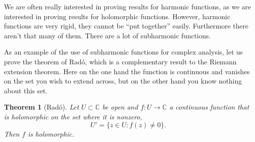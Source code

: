 \documentclass[12pt,openany]{book}
\newcommand{\C}{{\mathbb{C}}}
\theoremstyle{plain}
\newtheorem{thm}{Theorem}[section]
\theoremstyle{remark}
\theoremstyle{definition}
\theoremstyle{exercise}
\theoremstyle{example}
\begin{document}
We are often really interested in proving results for harmonic functions,
as we are interested in proving results for holomorphic functions.
However, harmonic functions are very rigid, they cannot be ``put together''
easily.  Furthermore there aren't that many of them.  There are a lot of
subharmonic functions.

As an example of the use of subharmonic functions for
complex analysis,
let us prove the theorem of 
Rad\'o, which is a complementary result to the Riemann extension theorem.
Here on the one hand the function is
continuous and vanishes on the set you wish to extend across, but on the
other hand you know nothing about this set.

\begin{thm}[Rad\'o]\label{thm:rado}
Let $U \subset \C$ be open and $f \colon U \to \C$ a continuous
function that is holomorphic on the set where it is nonzero,
\begin{equation*}
U' = \bigl\{ z \in U : f(z) \not= 0 \bigr\} .
\end{equation*}
Then $f$ is holomorphic.
\end{thm}
\end{document}
